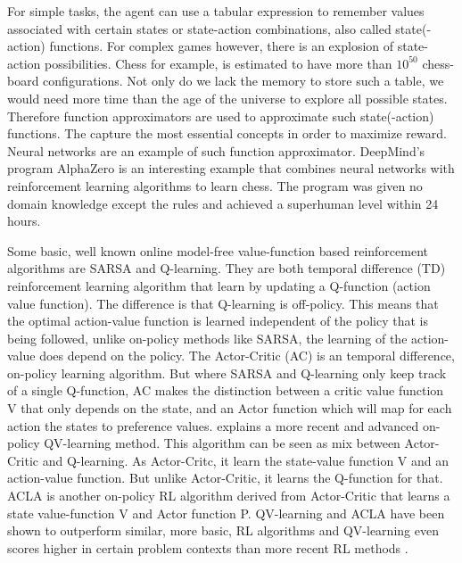 \documentclass[letterpaper]{article}
\begin{document}
For simple tasks, the agent can use a tabular expression to remember
values associated with certain states or state-action combinations, also
called state(-action) functions. For complex games however, there is an
explosion of state-action possibilities. Chess for example, is estimated
to have more than \(10^{50}\) chess-board configurations. Not only do we
lack the memory to store such a table, we would need more time than the
age of the universe to explore all possible states. Therefore function
approximators are used to approximate such state(-action) functions. The
capture the most essential concepts in order to maximize reward. Neural
networks are an example of such function approximator. DeepMind's
program AlphaZero is an interesting example that combines neural
networks with reinforcement learning algorithms to learn chess. The
program was given no domain knowledge except the rules and achieved a
superhuman level within 24 hours.

Some basic, well known online model-free value-function based
reinforcement algorithms are SARSA and Q-learning. They are both
temporal difference (TD) reinforcement learning algorithm that learn by
updating a Q-function (action value function). The difference is that
Q-learning is off-policy. This means that the optimal action-value
function is learned independent of the policy that is being followed,
unlike on-policy methods like SARSA, the learning of the action-value
does depend on the policy. The Actor-Critic (AC) is an temporal
difference, on-policy learning algorithm. But where SARSA and Q-learning
only keep track of a single Q-function, AC makes the distinction between
a critic value function V that only depends on the state, and an Actor
function which will map for each action the states to preference values.
\cite{wiering2007} explains a more recent and advanced on-policy QV-learning
method. This algorithm can be seen as mix between Actor-Critic and
Q-learning. As Actor-Critc, it learn the state-value function V and an
action-value function. But unlike Actor-Critic, it learns the Q-function
for that. ACLA is another on-policy RL algorithm derived from
Actor-Critic that learns a state value-function V and Actor function P.
QV-learning and ACLA have been shown to outperform similar, more basic,
RL algorithms \cite{wiering2007} and QV-learning even scores higher in
certain problem contexts than more recent RL methods \cite{wiering2009}.
\end{document}
